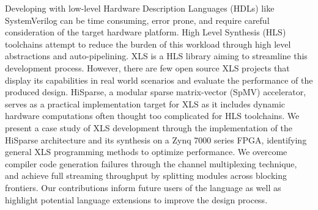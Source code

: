 Developing with low-level Hardware Description Languages (HDLs) like SystemVerilog can be time consuming, error prone, and require careful consideration of the target hardware platform. High Level Synthesis (HLS) toolchains attempt to reduce the burden of this workload through high level abstractions and auto-pipelining. XLS is a HLS library aiming to streamline this development process. However, there are few open source XLS projects that display its capabilities in real world scenarios and evaluate the performance of the produced design. HiSparse, a modular sparse matrix-vector (SpMV) accelerator, serves as a practical implementation target for XLS as it includes dynamic hardware computations often thought too complicated for HLS toolchains. We present a case study of XLS development through the implementation of the HiSparse architecture and its synthesis on a Zynq 7000 series FPGA, identifying general XLS programming methods to optimize performance. We overcome compiler code generation failures through the channel multiplexing technique, and achieve full streaming throughput by splitting modules across blocking frontiers. Our contributions inform future users of the language as well as highlight potential language extensions to improve the design process.
